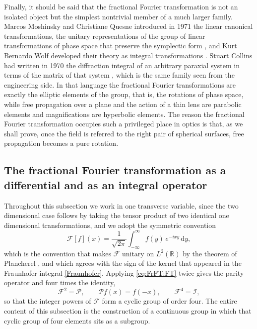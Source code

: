 		Finally, it should be said that the fractional Fourier transformation is not an isolated object but the simplest nontrivial member of a much larger family. Marcos Moshinsky and Christiane Quesne introduced in 1971 the linear canonical transformations, the unitary representations of the group of linear transformations of phase space that preserve the symplectic form \citep{moshinsky1971linear}, and Kurt Bernardo Wolf developed their theory as integral transformations \citep{wolf1979integral}. Stuart Collins had written in 1970 the diffraction integral of an arbitrary paraxial system in terms of the matrix of that system \citep{collins1970lens}, which is the same family seen from the engineering side. In that language the fractional Fourier transformations are exactly the elliptic elements of the group, that is, the rotations of phase space, while free propagation over a plane and the action of a thin lens are parabolic elements and magnifications are hyperbolic elements. The reason the fractional Fourier transformation occupies such a privileged place in optics is that, as we shall prove, once the field is referred to the right pair of spherical surfaces, free propagation becomes a pure rotation.

	\subsection{The fractional Fourier transformation as a differential and as an integral operator}

		Throughout this subsection we work in one transverse variable, since the two dimensional case follows by taking the tensor product of two identical one dimensional transformations, and we adopt the symmetric convention
		\begin{equation}\label{eq:FrFT:FT}
			\mathcal{F}[f](x) = \frac{1}{\sqrt{2\pi}}\int_{-\infty}^{\infty} f(y)\,e^{-ixy}\,\mathrm{d}y,
		\end{equation}
		which is the convention that makes $\mathcal{F}$ unitary on $L^2(\mathbb{R})$ by the theorem of Plancherel \citeyearpar{plancherel1910contribution}, and which agrees with the sign of the kernel that appeared in the Fraunhofer integral \eqref{Fraunhofer}. Applying \eqref{eq:FrFT:FT} twice gives the parity operator and four times the identity,
		\begin{equation}\label{eq:FrFT:Powers}
			\mathcal{F}^{2} = \mathcal{P}, \qquad \mathcal{P}f(x) = f(-x), \qquad \mathcal{F}^{4} = \mathcal{I},
		\end{equation}
		so that the integer powers of $\mathcal{F}$ form a cyclic group of order four. The entire content of this subsection is the construction of a continuous group in which that cyclic group of four elements sits as a subgroup.


